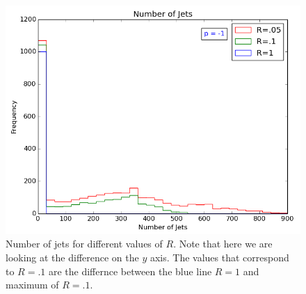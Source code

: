 \begin{figure}[hbtp]
 \centering
 \includegraphics[scale=.6]{images/n_of_jets_obs.png}
 \caption{Number of jets for different values of $R$. Note that here we are looking at the difference on the $y$ axis. The values that correspond to $R = .1$ are the differnce between the blue line $R = 1$ and maximum of $R = .1$.  }\label{nofjet}
 \end{figure}
  

